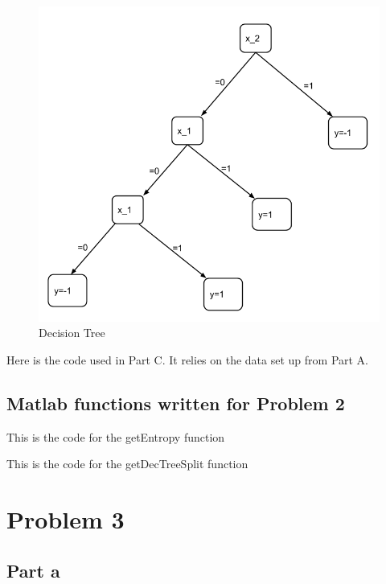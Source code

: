 \documentclass[twoside,11pt]{article}
\theoremstyle{definition}
\begin{document}
\begin{figure}[h]
\centering
\includegraphics[width=6 in]{hw4prob2DecisionTree.png}
\caption{Decision Tree}
\end{figure}

\newpage

Here is the code used in Part C. It relies on the data set up from Part A.



\subsection*{Matlab functions written for Problem 2}

This is the code for the getEntropy function


This is the code for the getDecTreeSplit function



\section*{Problem 3}

\subsection*{Part a}
\end{document}
